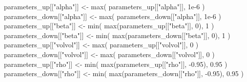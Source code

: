 \documentclass[
  letterpaper,
  DIV=11,
  numbers=noendperiod]{scrreprt}
\newenvironment{Shaded}{\begin{snugshade}}{\end{snugshade}}
\newcommand{\DecValTok}[1]{\textcolor[rgb]{0.68,0.00,0.00}{#1}}
\newcommand{\FloatTok}[1]{\textcolor[rgb]{0.68,0.00,0.00}{#1}}
\newcommand{\FunctionTok}[1]{\textcolor[rgb]{0.28,0.35,0.67}{#1}}
\newcommand{\NormalTok}[1]{\textcolor[rgb]{0.00,0.23,0.31}{#1}}
\newcommand{\OtherTok}[1]{\textcolor[rgb]{0.00,0.23,0.31}{#1}}
\newcommand{\SpecialCharTok}[1]{\textcolor[rgb]{0.37,0.37,0.37}{#1}}
\newcommand{\StringTok}[1]{\textcolor[rgb]{0.13,0.47,0.30}{#1}}
\begin{document}
\begin{Shaded}
\begin{Highlighting}[]
\NormalTok{    parameters\_up[[}\StringTok{"alpha"}\NormalTok{]] }\OtherTok{\textless{}{-}} \FunctionTok{max}\NormalTok{(}
\NormalTok{      parameters\_up[[}\StringTok{"alpha"}\NormalTok{]],}
      \FloatTok{1e{-}6}
\NormalTok{    )}
\NormalTok{    parameters\_down[[}\StringTok{"alpha"}\NormalTok{]] }\OtherTok{\textless{}{-}} \FunctionTok{max}\NormalTok{(}
\NormalTok{      parameters\_down[[}\StringTok{"alpha"}\NormalTok{]],}
      \FloatTok{1e{-}6}
\NormalTok{    )}
\NormalTok{    parameters\_up[[}\StringTok{"beta"}\NormalTok{]] }\OtherTok{\textless{}{-}} \FunctionTok{min}\NormalTok{(}
      \FunctionTok{max}\NormalTok{(parameters\_up[[}\StringTok{"beta"}\NormalTok{]], }\DecValTok{0}\NormalTok{),}
      \DecValTok{1}
\NormalTok{    )}
\NormalTok{    parameters\_down[[}\StringTok{"beta"}\NormalTok{]] }\OtherTok{\textless{}{-}} \FunctionTok{min}\NormalTok{(}
      \FunctionTok{max}\NormalTok{(parameters\_down[[}\StringTok{"beta"}\NormalTok{]], }\DecValTok{0}\NormalTok{),}
      \DecValTok{1}
\NormalTok{    )}
\NormalTok{    parameters\_up[[}\StringTok{"volvol"}\NormalTok{]] }\OtherTok{\textless{}{-}} \FunctionTok{max}\NormalTok{(}
\NormalTok{      parameters\_up[[}\StringTok{"volvol"}\NormalTok{]],}
      \DecValTok{0}
\NormalTok{    )}
\NormalTok{    parameters\_down[[}\StringTok{"volvol"}\NormalTok{]] }\OtherTok{\textless{}{-}} \FunctionTok{max}\NormalTok{(}
\NormalTok{      parameters\_down[[}\StringTok{"volvol"}\NormalTok{]],}
      \DecValTok{0}
\NormalTok{    )}
\NormalTok{    parameters\_up[[}\StringTok{"rho"}\NormalTok{]] }\OtherTok{\textless{}{-}} \FunctionTok{min}\NormalTok{(}
      \FunctionTok{max}\NormalTok{(parameters\_up[[}\StringTok{"rho"}\NormalTok{]], }\SpecialCharTok{{-}}\FloatTok{0.95}\NormalTok{),}
      \FloatTok{0.95}
\NormalTok{    )}
\NormalTok{    parameters\_down[[}\StringTok{"rho"}\NormalTok{]] }\OtherTok{\textless{}{-}} \FunctionTok{min}\NormalTok{(}
      \FunctionTok{max}\NormalTok{(parameters\_down[[}\StringTok{"rho"}\NormalTok{]], }\SpecialCharTok{{-}}\FloatTok{0.95}\NormalTok{),}
      \FloatTok{0.95}
\NormalTok{    )}


\end{Highlighting}
\end{Shaded}
\end{document}
